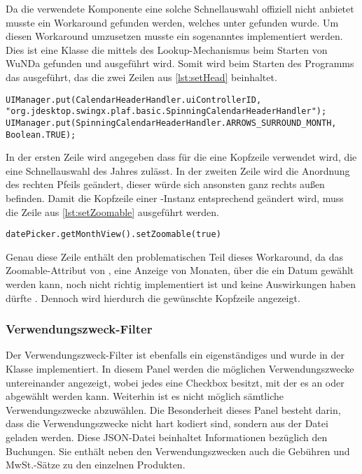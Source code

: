 Da die verwendete Komponente  eine solche Schnellauswahl offiziell nicht anbietet musste ein Workaround gefunden werden, welches unter \autocite{so-jxdatepicker} gefunden wurde.
Um diesen Workaround umzusetzen musste ein sogenanntes  implementiert werden. 
Dies ist eine Klasse die mittels des Lookup-Mechanismus beim Starten von \ac{WuNDa} gefunden und ausgeführt wird.
Somit wird beim Starten des Programms das   ausgeführt, das die zwei Zeilen aus \autoref{lst:setHead} beinhaltet.\\
\begin{minipage}{\textwidth}
\begin{lstlisting}[caption=innerhalb \texttt{JXDatePickerHeaderTakeoff}, label=lst:setHead]
UIManager.put(CalendarHeaderHandler.uiControllerID, "org.jdesktop.swingx.plaf.basic.SpinningCalendarHeaderHandler");
UIManager.put(SpinningCalendarHeaderHandler.ARROWS_SURROUND_MONTH, Boolean.TRUE);
\end{lstlisting}
\end{minipage}

In der ersten Zeile wird angegeben dass für die  eine Kopfzeile verwendet wird, die eine Schnellauswahl des Jahres zulässt.
In der zweiten Zeile wird die Anordnung des rechten Pfeils geändert, dieser würde sich ansonsten ganz rechts außen befinden.
Damit die Kopfzeile einer -Instanz  entsprechend geändert wird, muss die Zeile aus \autoref{lst:setZoomable} ausgeführt werden.\\
\begin{minipage}{\textwidth}
\begin{lstlisting}[caption=Setzen der Kopfzeile, label=lst:setZoomable]
datePicker.getMonthView().setZoomable(true)
\end{lstlisting}
\end{minipage}

Genau diese Zeile enthält den problematischen Teil dieses Workaround, da das Zoomable-Attribut von , eine Anzeige von Monaten, über die ein Datum gewählt werden kann, noch nicht richtig implementiert ist und keine Auswirkungen haben dürfte \autocite[vgl.][]{swingx-jxdatepicker}.
Dennoch wird hierdurch die gewünschte Kopfzeile angezeigt.

\subsubsection{Verwendungszweck-Filter}
Der Verwendungszweck-Filter ist ebenfalls ein eigenständiges  und wurde in der Klasse  implementiert.
In diesem Panel werden die möglichen Verwendungszwecke untereinander angezeigt, wobei jedes eine Checkbox besitzt, mit der es an oder abgewählt werden kann. Weiterhin ist es nicht möglich sämtliche Verwendungszwecke abzuwählen.
Die Besonderheit dieses Panel besteht darin, dass die Verwendungszwecke nicht hart kodiert sind, sondern aus der  Datei geladen werden.
Diese \ac{JSON}-Datei beinhaltet Informationen bezüglich den Buchungen. Sie enthält neben den Verwendungszwecken auch die Gebühren und MwSt.-Sätze zu den einzelnen Produkten. 

